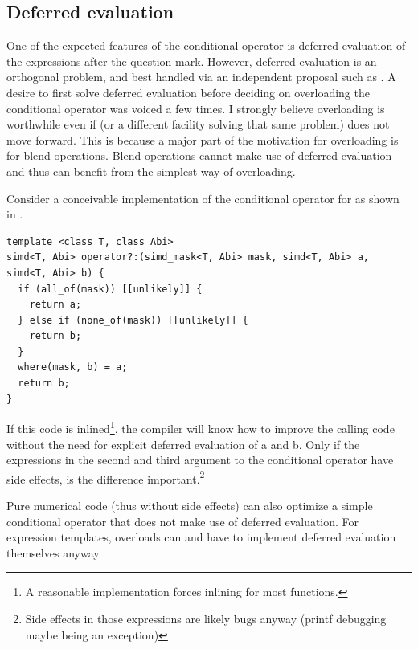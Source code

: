 \subsection{Deferred evaluation}
One of the expected features of the conditional operator is deferred evaluation of the expressions after the question mark.
However, deferred evaluation is an orthogonal problem, and best handled via an independent proposal such as \cite{P0927R2}.
A desire to first solve deferred evaluation before deciding on overloading the conditional operator was voiced a few times.
I strongly believe  overloading is worthwhile even if \cite{P0927R2} (or a different facility solving that same problem) does not move forward.
This is because a major part of the motivation for  overloading is for blend operations.
Blend operations cannot make use of deferred evaluation and thus can benefit from the simplest way of  overloading.

Consider a conceivable implementation of the conditional operator for  as shown in .
\begin{lstlisting}[style=Vc,float,label=lst:simd ?:,caption={
Simple \code{operator?:} for \type{simd<T, Abi>}
}]
template <class T, class Abi>
simd<T, Abi> operator?:(simd_mask<T, Abi> mask, simd<T, Abi> a, simd<T, Abi> b) {
  if (all_of(mask)) [[unlikely]] {
    return a;
  } else if (none_of(mask)) [[unlikely]] {
    return b;
  }
  where(mask, b) = a;
  return b;
}
\end{lstlisting}
If this code is inlined\footnote{A reasonable  implementation forces inlining for most functions.}, the compiler will know how to improve the calling code without the need for explicit deferred evaluation of \code a and \code b.
Only if the expressions in the second and third argument to the conditional operator have side effects, is the difference important.\footnote{Side effects in those expressions are likely bugs anyway (printf debugging maybe being an exception)}

Pure numerical code (thus without side effects) can also optimize a simple conditional operator that does not make use of deferred evaluation.
For expression templates,  overloads can and have to implement deferred evaluation themselves anyway.


